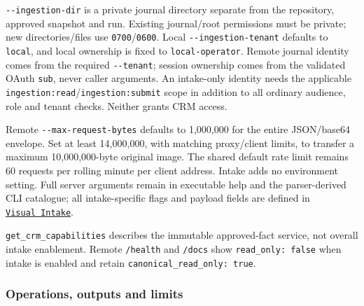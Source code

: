 \documentclass[
]{article}
\begin{document}
\texttt{-\/-ingestion-dir} is a private journal directory separate from
the repository, approved snapshot and run. Existing journal/root
permissions must be private; new directories/files use
\texttt{0700}/\texttt{0600}. Local \texttt{-\/-ingestion-tenant}
defaults to \texttt{local}, and local ownership is fixed to
\texttt{local-operator}. Remote journal identity comes from the required
\texttt{-\/-tenant}; session ownership comes from the validated OAuth
\texttt{sub}, never caller arguments. An intake-only identity needs the
applicable \texttt{ingestion:read}/\texttt{ingestion:submit} scope in
addition to all ordinary audience, role and tenant checks. Neither
grants CRM access.

Remote \texttt{-\/-max-request-bytes} defaults to 1,000,000 for the
entire JSON/base64 envelope. Set at least 14,000,000, with matching
proxy/client limits, to transfer a maximum 10,000,000-byte original
image. The shared default rate limit remains 60 requests per rolling
minute per client address. Intake adds no environment setting. Full
server arguments remain in executable help and the parser-derived CLI
catalogue; all intake-specific flags and payload fields are defined in
\href{../references/visual-ingestion.md}{\texttt{Visual\ Intake}}.

\texttt{get\_\allowbreak{}crm\_\allowbreak{}capabilities} describes the
immutable approved-fact service, not overall intake enablement. Remote
\texttt{/\allowbreak{}health} and \texttt{/\allowbreak{}docs} show
\texttt{read\_\allowbreak{}only: false} when intake is enabled and
retain \texttt{canonical\_\allowbreak{}read\_\allowbreak{}only: true}.

\subsubsection{Operations, outputs and
limits}\label{operations-outputs-and-limits}
\end{document}
